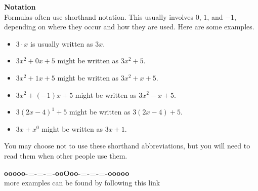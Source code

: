 \documentclass{ximera}
\begin{document}
\begin{warning} \textbf{\textcolor{red!90!darkgray}{Notation}}  \\


Formulas often use shorthand notation.  This usually involves $0$, $1$, and $-1$, depending on where they occur and how they are used.  Here are some examples.


\begin{itemize}
\item $3 \cdot x$ is usually written as $3x$.
\item $3x^2 + 0 x + 5$  might be written as $3x^2 + 5$.
\item $3x^2 + 1 x + 5$  might be written as $3x^2 + x + 5$.
\item $3x^2 + (-1) x + 5$  might be written as $3x^2 - x + 5$.
\item $3(2x-4)^1 + 5$  might be written as $3(2x-4) + 5$.
\item $3x + x^0$  might be written as $3x + 1$.
\end{itemize}


You may choose not to use these shorthand abbreviations, but you will need to read them when other people use them.

\end{warning}

















\begin{center}
\textbf{\textcolor{green!50!black}{ooooo-=-=-=-ooOoo-=-=-=-ooooo}} \\

more examples can be found by following this link\\ 

\end{center}
\end{document}
